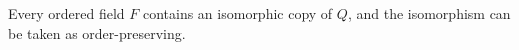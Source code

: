 Every ordered field $F$ contains an isomorphic copy of $Q$, and the isomorphism can be taken as order-preserving.